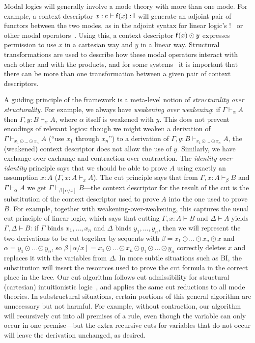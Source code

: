 \documentclass[a4paper,USenglish,numberwithinsect]{lipics-v2016}
\newcommand\seq[3]{\ensuremath{#1 \vdash_{#2} #3}}
\renewcommand\subst[3]{\ensuremath{#1[#2/#3]}}
\begin{document}
Modal logics will generally involve a mode theory with more than one
mode.  For example, a context descriptor $x : \mathsf{c} \vdash \mathsf{f}(x)
: \mathsf{l}$ will generate an adjoint pair of functors between the two
modes, as in the adjoint syntax for linear logic's
$!$~\cite{bentonwadler96adjoint} or other modal
operators~\cite{reed09adjoint}.  Using this, a context descriptor
$\mathsf{f}(x) \odot y$ expresses permission to use $x$ in a cartesian way
and $y$ in a linear way.  Structural transformations are used to
describe how these modal operators interact with each other and with the
products, and for some systems~\cite{ls16adjoint} it is important that
there can be more than one transformation between a given pair of
context descriptors.

A guiding principle of the framework is a meta-level notion of
\emph{structurality over structurality}.  For example, we always have
\emph{weakening over weakening}: if \seq{\Gamma}{\alpha}{A} then
\seq{\Gamma,y:B}{\alpha}{A}, where $\alpha$ itself is weakened with $y$.
This does not prevent encodings of relevant logics: though we might
weaken a derivation of \seq{\Gamma}{x_1 \odot \ldots \odot x_n}{A}
(``use $x_1$ through $x_n$'') to a derivation of \seq{\Gamma,y:B}{x_1
  \odot \ldots \odot x_n}{A}, the (weakened) context descriptor does not
allow the use of $y$.  Similarly, we have exchange over exchange and
contraction over contraction.  The \emph{identity-over-identity}
principle says that we should be able to prove $A$ using exactly an
assumption $x:A$ ({\seq{\Gamma,x:A}{x}{A}}).  The cut principle says
that from \seq{\Gamma,x:A}{\beta}{B} and \seq{\Gamma}{\alpha}{A} we get
{\seq{\Gamma}{\subst{\beta}{\alpha}{x}}{B}}---the context descriptor for
the result of the cut is the substitution of the context descriptor used
to prove $A$ into the one used to prove $B$.  For example, together with
weakening-over-weakening, this captures the usual cut principle of
linear logic, which says that cutting $\Gamma,x:A \vdash B$ and $\Delta
\vdash A$ yields $\Gamma,\Delta \vdash B$: if $\Gamma$ binds
$x_1,\ldots,x_n$ and $\Delta$ binds $y_1,\ldots,y_n$, then we will
represent the two derivations to be cut together by sequents with $\beta
= x_1 \odot \ldots \odot x_n \odot x$ and $\alpha = y_1 \odot \ldots
\odot y_n$, so $\beta[\alpha/x] = x_1 \odot \ldots \odot x_n \odot y_1
\odot \ldots \odot y_n$ correctly deletes $x$ and replaces it with the
variables from $\Delta$.  In more subtle situations such as BI, the
substitution will insert the resources used to prove the cut formula in
the correct place in the tree.  Our cut algorithm follows cut
admissibility for structural (cartesian) intuitionistic
logic~\cite{pfenning94cut}, and applies the same cut reductions to all
mode theories.  In substructural situations, certain portions of this
general algorithm are unnecessary but not harmful.  For example, without
contraction, our algorithm will recursively cut into all premises of a
rule, even though the variable can only occur in one premise---but the
extra recursive cuts for variables that do not occur will leave the
derivation unchanged, as desired.
\end{document}
